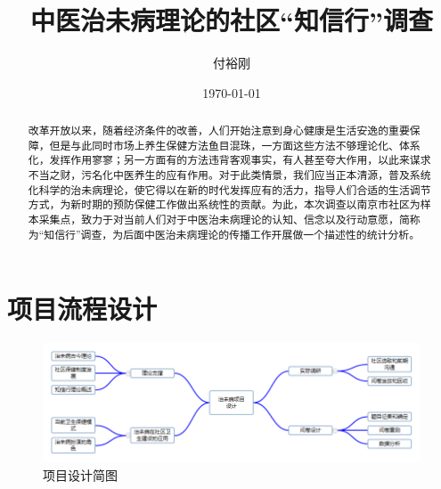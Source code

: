 \documentclass{ctexart}
\title{中医治未病理论的社区“知信行”调查}
\author{付裕刚}
\date{\today}
\begin{document}
	\maketitle
	\begin{abstract}
	改革开放以来，随着经济条件的改善，人们开始注意到身心健康是生活安逸的重要保障，但是与此同时市场上养生保健方法鱼目混珠，一方面这些方法不够理论化、体系化，发挥作用寥寥；另一方面有的方法违背客观事实，有人甚至夸大作用，以此来谋求不当之财，污名化中医养生的应有作用。对于此类情景，我们应当正本清源，普及系统化科学的治未病理论，使它得以在新的时代发挥应有的活力，指导人们合适的生活调节方式，为新时期的预防保健工作做出系统性的贡献。为此，本次调查以南京市社区为样本采集点，致力于对当前人们对于中医治未病理论的认知、信念以及行动意愿，简称为“知信行”调查，为后面中医治未病理论的传播工作开展做一个描述性的统计分析。
	\end{abstract}
\tableofcontents
\section{项目流程设计}
\begin{figure}[th]
	\includegraphics[width=\textwidth]{process.png}
	\centering
	\caption{项目设计简图}
\end{figure}

\printbibliography

\end{document}
